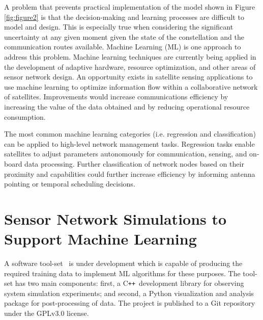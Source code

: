 \documentclass[conference]{IEEEtran}
\newcommand{\project}{{\sc{Collaborate}}~}
\newcommand{\cpp}{C\texttt{++}~}
\begin{document}
A problem that prevents practical implementation of the model shown in
Figure \ref{fig:figure2} is that the decision-making and learning processes are
difficult to model and design.  This is especially true when considering
the significant uncertainty at any given moment given the state of the
constellation and the communication routes available.  Machine Learning (ML) is
one approach to address this problem.  Machine learning techniques are
currently being applied in the development of adaptive hardware, resource
optimization, and other areas of sensor network design.  An opportunity exists
in satellite sensing applications to use machine learning to optimize information flow within a collaborative
network of satellites.  Improvements would increase communications efficiency by
increasing the value of the data obtained and by reducing operational resource
consumption.

The most common machine learning categories (i.e. regression and classification)
can be applied to high-level network management tasks.  Regression tasks enable
satellites to adjust parameters autonomously for communication, sensing, and
on-board data processing.  Further classification of network nodes based on their proximity
and capabilities could further increase efficiency by informing antenna pointing or
temporal scheduling decisions.  %

\section{Sensor Network Simulations to Support Machine Learning}
\label{sec:software}


A software tool-set \project is under development which is capable of producing
the required training data to implement ML algorithms for these purposes.  The tool-set has two main components:
first, a \cpp development library for observing system simulation experiments;
and second, a Python visualization and analysis package for post-processing of
data.  The project is published to a Git repository under the GPLv3.0 license.
\end{document}

